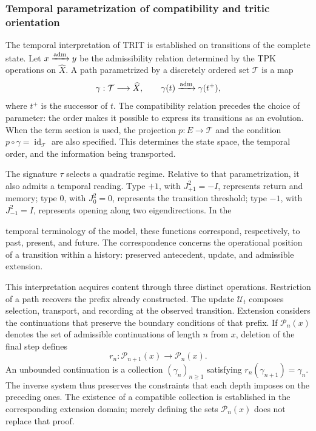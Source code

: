 \subsubsection{Temporal parametrization of compatibility and tritic orientation}
\label{trit-temporal-compatibilidad}

The temporal interpretation of TRIT is established on transitions of the
complete state. Let \(x\xrightarrow{\rm adm}y\) be the admissibility relation determined
by the TPK operations on \(\widehat X\). A path parametrized
by a discretely ordered set \(\mathcal T\) is a map
\[
 \gamma:\mathcal T\longrightarrow\widehat X,\qquad
 \gamma(t)\xrightarrow{\rm adm}\gamma(t^+),
\]
where \(t^+\) is the successor of \(t\). The compatibility relation precedes
the choice of parameter: the order makes it possible to express its transitions as
an evolution. When the term section is used, the projection
\(p:E\to\mathcal T\) and the condition
\(p\circ\gamma=\operatorname{id}_{\mathcal T}\) are also specified. This determines
the state space, the temporal order, and the information being transported.

The signature \(\tau\) selects a quadratic regime. Relative to that
parametrization, it also admits a temporal reading. Type \(+1\), with
\(J_{+1}^{2}=-I\), represents return and memory; type \(0\), with
\(J_0^{2}=0\), represents the transition threshold; type \(-1\), with
\(J_{-1}^{2}=I\), represents opening along two eigendirections. In the

temporal terminology of the model, these functions correspond,
respectively, to past, present, and future. The correspondence concerns
the operational position of a transition within a history:
preserved antecedent, update, and admissible extension.

This interpretation acquires content through three distinct operations.
Restriction of a path recovers the prefix already constructed. The
update \(\mathcal U_t\) composes selection, transport, and recording at
the observed transition. Extension considers the continuations that
preserve the boundary conditions of that prefix. If
\(\mathcal P_n(x)\) denotes the set of admissible continuations of
length \(n\) from \(x\), deletion of the final step defines
\[
 r_n:\mathcal P_{n+1}(x)\longrightarrow\mathcal P_n(x).
\]
An unbounded continuation is a collection \((\gamma_n)_{n\geq1}\) satisfying
\(r_n(\gamma_{n+1})=\gamma_n\). The inverse system thus preserves
the constraints that each depth imposes on the preceding ones.
The existence of a compatible collection is established in the corresponding
extension domain; merely defining the sets
\(\mathcal P_n(x)\) does not replace that proof.

